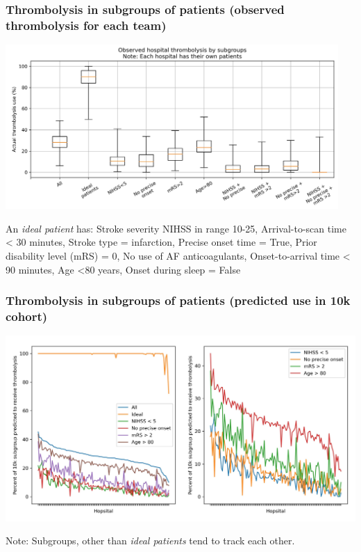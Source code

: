 \documentclass{beamer}
\begin{document}

\begin{frame}
\frametitle{Thrombolysis in subgroups of patients (observed thrombolysis for each team)}

\begin{center}
\includegraphics[width=0.95\textwidth]{./images/15b_actual_subgroup_violin.jpg}
\end{center}


\scriptsize An \emph{ideal patient} has: Stroke severity NIHSS in range 10-25, Arrival-to-scan time \textless{} 30 minutes, Stroke type = infarction, Precise onset time = True, Prior disability level (mRS) = 0, No use of AF anticoagulants, Onset-to-arrival time \textless{} 90 minutes, Age \textless{80 years}, Onset during sleep = False
\end{frame}


\begin{frame}
\frametitle{Thrombolysis in subgroups of patients (predicted use in 10k cohort)}

    \begin{center}
    \includegraphics[width=1.0\textwidth]{./images/15_10k_subgroup.jpg}
    \end{center}

\footnotesize Note: Subgroups, other than \emph{ideal patients} tend to track each other.  

\end{frame}
\end{document}
